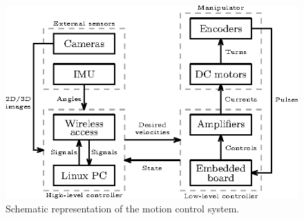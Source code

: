 \documentclass[journal,twoside]{IEEEtran}
\theoremstyle{definition}
\begin{document}
\begin{figure}[t]
\centering
\includegraphics[scale = 1]{fig6}
\caption{Schematic representation of the motion control system.}
\label{fig:motion_controller}
\end{figure}
\end{document}
